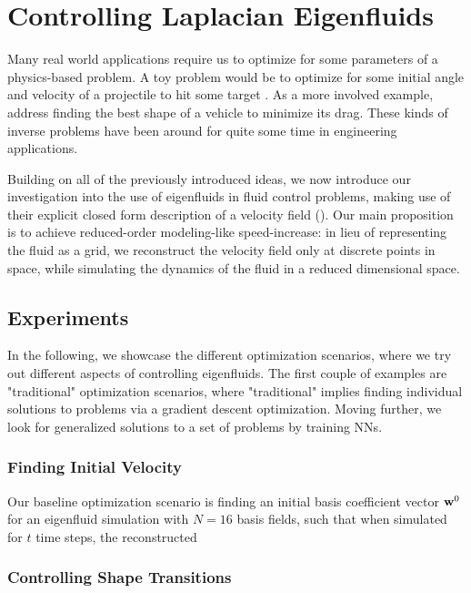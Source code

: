 \chapter{Controlling Laplacian Eigenfluids}
Many real world applications require us to optimize for some parameters of
a physics-based problem. A toy problem would be to optimize for some initial
angle and velocity of a projectile to hit some target . As a more involved example, \cite{MinDrag} address
finding the best shape of a vehicle to minimize its drag. These kinds of
inverse problems have been around for quite some time in engineering
applications.

Building on all of the previously introduced ideas, we now introduce our
investigation into the use of eigenfluids in fluid control problems, making use
of their explicit closed form description of a velocity field (). Our main proposition is to achieve reduced-order modeling-like
speed-increase: in lieu of representing the fluid as a grid, we reconstruct the
velocity field only at discrete points in space, while simulating the dynamics
of the fluid in a reduced dimensional space.


\section{Experiments}
In the following, we showcase the different optimization scenarios, where
we try out different aspects of controlling eigenfluids. The first couple of
examples are "traditional" optimization scenarios, where "traditional" implies
finding individual solutions to problems via a gradient descent optimization.
Moving further, we look for generalized solutions to a set of problems by
training \acp{NN}.

\subsection{Finding Initial Velocity}
Our baseline optimization scenario is finding an initial basis coefficient
vector $\vb{w}^0$ for an eigenfluid simulation with $N=16$ basis fields, such
that when simulated for $t$ time steps, the reconstructed 

\subsection{Controlling Shape Transitions}
\label{section:controlling-shape-transitions}

